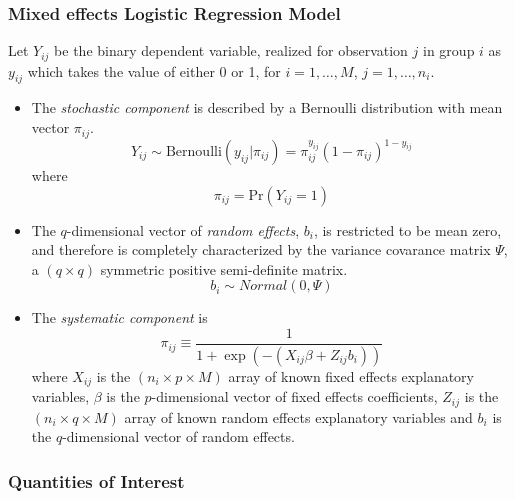 \subsubsection{Mixed effects Logistic Regression Model}

Let $Y_{ij}$ be the binary dependent variable, realized for observation $j$ in group $i$ as $y_{ij}$ which takes the value of either 0 or 1, for $i = 1, \ldots, M$, $j = 1, \ldots, n_i$.

\begin{itemize}
\item The \emph{stochastic component} is described by a Bernoulli distribution with mean vector $\pi_{ij}$.
\begin{equation*}
Y_{ij} \sim \mathrm{Bernoulli}(y_{ij} | \pi_{ij}) = \pi_{ij}^{y_{ij}} (1 - \pi_{ij})^{1 - y_{ij}}
\end{equation*}
where
\begin{equation*}
\pi_{ij} = \mathrm{Pr}(Y_{ij} = 1)
\end{equation*}
\item The $q$-dimensional vector of \emph{random effects}, $b_i$, is restricted to be mean zero, and therefore is completely characterized by the variance covarance matrix $\Psi$, a $(q \times q)$ symmetric positive semi-definite matrix.
\begin{equation*}
b_i \sim Normal(0, \Psi)
\end{equation*}
\item The \emph{systematic component} is
\begin{equation*}
\pi_{ij} \equiv \frac{1}{1 + \exp(-(X_{ij} \beta + Z_{ij} b_i))}
\end{equation*}
where $X_{ij}$ is the $(n_i \times p \times M)$ array of known fixed effects explanatory variables, $\beta$ is the $p$-dimensional vector of fixed effects coefficients, $Z_{ij}$ is the $(n_i \times q \times M)$ array of known random effects explanatory variables and $b_i$ is the $q$-dimensional vector of random effects.
\end{itemize}


\subsubsection{Quantities of Interest}

